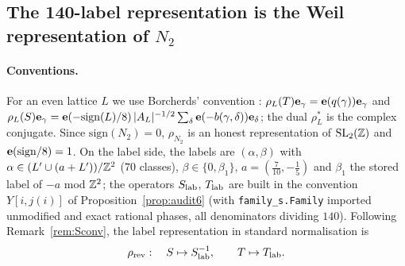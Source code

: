 \subsection{The 140-label representation is the Weil representation of $N_2$}\label{sec:rev8weil}
\paragraph{Conventions.} For an even lattice $L$ we use Borcherds' convention \cite{Borcherds}: $\rho_L(T)\mathbf{e}_\gamma=\mathbf{e}(q(\gamma))\mathbf{e}_\gamma$ and $\rho_L(S)\mathbf{e}_\gamma=\mathbf{e}(-\mathrm{sign}(L)/8)\,|A_L|^{-1/2}\sum_\delta\mathbf{e}(-b(\gamma,\delta))\mathbf{e}_\delta$; the dual $\rho_L^*$ is the complex conjugate. Since $\mathrm{sign}(N_2)=0$, $\rho_{N_2}$ is an honest representation of $\mathrm{SL}_2(\mathbb{Z})$ and $\mathbf{e}(\mathrm{sign}/8)=1$. On the label side, the labels are $(\alpha,\beta)$ with $\alpha\in(L'\cup(a+L'))/\mathbb{Z}^2$ ($70$ classes), $\beta\in\{0,\beta_1\}$, $a=(\tfrac7{10},-\tfrac15)$ and $\beta_1$ the stored label of $-a$ mod $\mathbb{Z}^2$; the operators $S_{\rm lab}$, $T_{\rm lab}$ are built in the convention $Y[i,j(i)]$ of Proposition~\ref{prop:audit6} (with \texttt{family\_s.Family} imported unmodified and exact rational phases, all denominators dividing $140$). Following Remark~\ref{rem:Sconv}, the label representation in standard normalisation is
\[
\rho_{\rm rev}:\quad S\mapsto S_{\rm lab}^{-1},\qquad T\mapsto T_{\rm lab}.
\]

